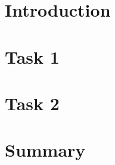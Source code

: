 \documentclass[fleqn,12pt]{article} %
\begin{document}

%
%


\section{Introduction}


\section{Task 1}


\section{Task 2}

\section{Summary}


%
\end{document}

